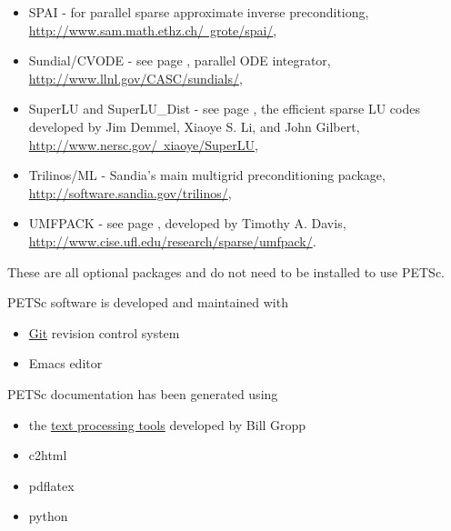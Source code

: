 \begin{itemize}
  \item SPAI -        for parallel sparse approximate inverse preconditiong,
                     \href{http://www.sam.math.ethz.ch/~grote/spai/}{http://www.sam.math.ethz.ch/~grote/spai/},
  \item Sundial/CVODE - see page \pageref{sec_sundials}, parallel ODE integrator,
                     \href{http://www.llnl.gov/CASC/sundials/}{http://www.llnl.gov/CASC/sundials/},
  \item SuperLU and SuperLU\_Dist - see page \pageref{sec_externalsol},
                    the efficient sparse LU codes developed by Jim Demmel,  Xiaoye S. Li, and John Gilbert,
                    \href{http://www.nersc.gov/~xiaoye/SuperLU}{http://www.nersc.gov/~xiaoye/SuperLU},
  \item Trilinos/ML - Sandia's main multigrid preconditioning package, \href{http://software.sandia.gov/trilinos/}{http://software.sandia.gov/trilinos/},
  \item UMFPACK - see page \pageref{sec_externalsol},
                    developed by Timothy A. Davis,
                    \href{http://www.cise.ufl.edu/research/sparse/umfpack/}{http://www.cise.ufl.edu/research/sparse/umfpack/}.
\end{itemize}
These are all optional packages and do not need to be installed to use PETSc.

PETSc software is developed and maintained with
\begin{itemize}
\item \href{http://git-scm.com/}{Git} revision control system
\item Emacs editor
\end{itemize}

PETSc documentation has been generated using
\begin{itemize}
\item the \href{http://www.cs.uiuc.edu/~wgropp/projects/software/sowing/index.htm}{text processing tools} developed by Bill Gropp
\item c2html
\item pdflatex
\item python
\end{itemize}

